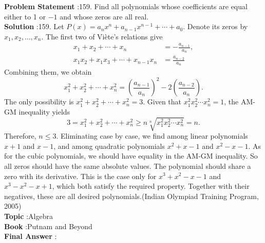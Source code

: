 \documentclass[10pt]{article}
\begin{document}
\textbf{Problem Statement} :159. Find all polynomials whose coefficients are equal either to 1 or $-1$ and whose zeros are all real.\\
\textbf{Solution} :159. Let $P(x)=a_{n} x^{n}+a_{n-1} x^{n-1}+\cdots+a_{0}$. Denote its zeros by $x_{1}, x_{2}, \ldots, x_{n}$. The first two of Viète's relations give$$ \begin{aligned} x_{1}+x_{2}+\cdots+x_{n} &=-\frac{a_{n-1}}{a_{n}}, \\ x_{1} x_{2}+x_{1} x_{3}+\cdots+x_{n-1} x_{n} &=\frac{a_{n-2}}{a_{n}} \end{aligned} $$Combining them, we obtain$$ x_{1}^{2}+x_{2}^{2}+\cdots+x_{n}^{2}=\left(\frac{a_{n-1}}{a_{n}}\right)^{2}-2\left(\frac{a_{n-2}}{a_{n}}\right) . $$The only possibility is $x_{1}^{2}+x_{2}^{2}+\cdots+x_{n}^{2}=3$. Given that $x_{1}^{2} x_{2}^{2} \cdots x_{n}^{2}=1$, the AM-GM inequality yields $$ 3=x_{1}^{2}+x_{2}^{2}+\cdots+x_{n}^{2} \geq n \sqrt[n]{x_{1}^{2} x_{2}^{2} \cdots x_{n}^{2}}=n . $$Therefore, $n \leq 3$. Eliminating case by case, we find among linear polynomials $x+1$ and $x-1$, and among quadratic polynomials $x^{2}+x-1$ and $x^{2}-x-1$. As for the cubic polynomials, we should have equality in the AM-GM inequality. So all zeros should have the same absolute values. The polynomial should share a zero with its derivative. This is the case only for $x^{3}+x^{2}-x-1$ and $x^{3}-x^{2}-x+1$, which both satisfy the required property. Together with their negatives, these are all desired polynomials.(Indian Olympiad Training Program, 2005)\\
\textbf{Topic} :Algebra\\
\textbf{Book} :Putnam and Beyond\\
\textbf{Final Answer} :\\
\end{document}
